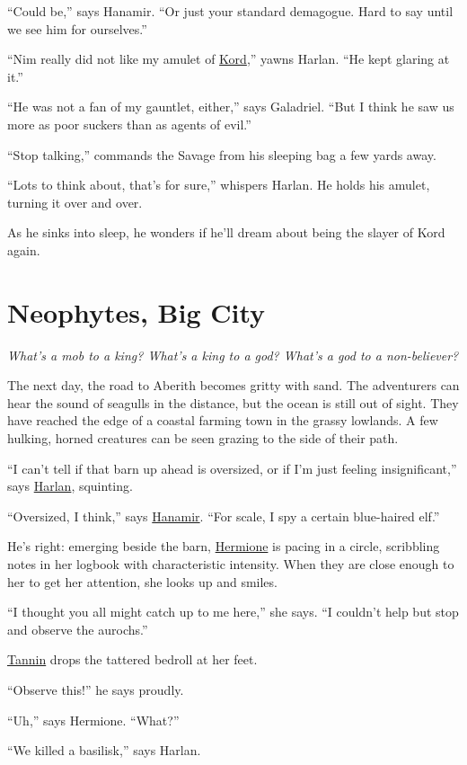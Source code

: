 \documentclass[smalldemyvopaper,11pt,twoside,onecolumn,openright,extrafontsizes]{memoir}
\newcommand{\chapdesc}[1]{
    \begin{flushright}
    \emph{{#1}}
    \end{flushright}
    \vspace{26pt}
}
\newlength\drop
\begin{document}
``Could be,'' says Hanamir. ``Or just your standard demagogue. Hard to
say until we see him for ourselves.''

``Nim really did not like my amulet of \href{/characters/kord/}{Kord},''
yawns Harlan. ``He kept glaring at it.''

``He was not a fan of my gauntlet, either,'' says Galadriel. ``But I
think he saw us more as poor suckers than as agents of evil.''

``Stop talking,'' commands the Savage from his sleeping bag a few yards
away.

``Lots to think about, that's for sure,'' whispers Harlan. He holds his
amulet, turning it over and over.

As he sinks into sleep, he wonders if he'll dream about being the slayer
of Kord again.


\chapter{Neophytes, Big City}
\chapdesc{What's a mob to a king? What's a king to a god? What's a god to a non-believer?}

The next day, the road to Aberith becomes gritty with sand. The
adventurers can hear the sound of seagulls in the distance, but the
ocean is still out of sight. They have reached the edge of a coastal
farming town in the grassy lowlands. A few hulking, horned creatures can
be seen grazing to the side of their path.

``I can't tell if that barn up ahead is oversized, or if I'm just
feeling insignificant,'' says \href{/characters/harlan/}{Harlan},
squinting.

``Oversized, I think,'' says \href{/characters/hanamir/}{Hanamir}. ``For
scale, I spy a certain blue-haired elf.''

He's right: emerging beside the barn,
\href{/characters/hermione/}{Hermione} is pacing in a circle, scribbling
notes in her logbook with characteristic intensity. When they are close
enough to her to get her attention, she looks up and smiles.

``I thought you all might catch up to me here,'' she says. ``I couldn't
help but stop and observe the aurochs.''

\href{/characters/tannin/}{Tannin} drops the tattered bedroll at her
feet.

``Observe this!'' he says proudly.

``Uh,'' says Hermione. ``What?''

``We killed a basilisk,'' says Harlan.
\end{document}
